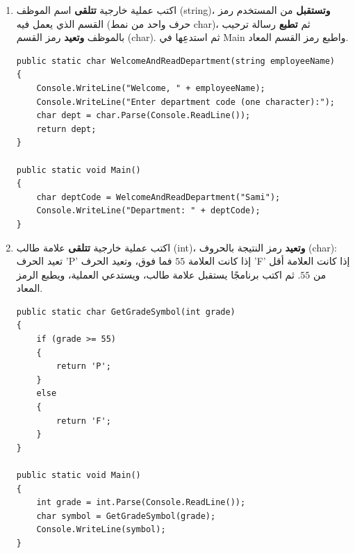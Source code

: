 \documentclass[14pt]{extarticle}
\begin{document}
\begin{enumerate}[resume, itemsep=1em]
\begin{boxSolution}
\begin{english}
\begin{verbatim}
public static void Main()
{
    string fullName = GetFullName("Mahmoud", "Agbariya");
    Console.WriteLine(fullName);
}
\end{verbatim}
\end{english}
\end{boxSolution}
\fi
\filbreak

\item اكتب عملية خارجية \textbf{تتلقى} اسم الموظف (\textenglish{string})، \textbf{وتستقبل} من المستخدم رمز القسم الذي يعمل فيه (حرف واحد من نمط \textenglish{char})، ثم \textbf{تطبع} رسالة ترحيب بالموظف \textbf{وتعيد} رمز القسم (\textenglish{char}). ثم استدعِها في \textenglish{Main} واطبع رمز القسم المعاد.
\ifwithsols
\begin{boxSolution}
\begin{english}
\begin{verbatim}
public static char WelcomeAndReadDepartment(string employeeName)
{
    Console.WriteLine("Welcome, " + employeeName);
    Console.WriteLine("Enter department code (one character):");
    char dept = char.Parse(Console.ReadLine());
    return dept;
}

public static void Main()
{
    char deptCode = WelcomeAndReadDepartment("Sami");
    Console.WriteLine("Department: " + deptCode);
}
\end{verbatim}
\end{english}
\end{boxSolution}
\fi
\filbreak

\item اكتب عملية خارجية \textbf{تتلقى} علامة طالب (\textenglish{int})، \textbf{وتعيد} رمز النتيجة بالحروف (\textenglish{char}): تعيد الحرف \textenglish{'P'} إذا كانت العلامة $55$ فما فوق، وتعيد الحرف \textenglish{'F'} إذا كانت العلامة أقل من $55$. ثم اكتب برنامجًا يستقبل علامة طالب، ويستدعي العملية، ويطبع الرمز المعاد.
\ifwithsols
\begin{boxSolution}
\begin{english}
\begin{verbatim}
public static char GetGradeSymbol(int grade)
{
    if (grade >= 55)
    {
        return 'P';
    }
    else
    {
        return 'F';
    }
}

public static void Main()
{
    int grade = int.Parse(Console.ReadLine());
    char symbol = GetGradeSymbol(grade);
    Console.WriteLine(symbol);
}
\end{verbatim}
\end{english}
\end{boxSolution}
\fi
\filbreak

\end{enumerate}
\end{document}
